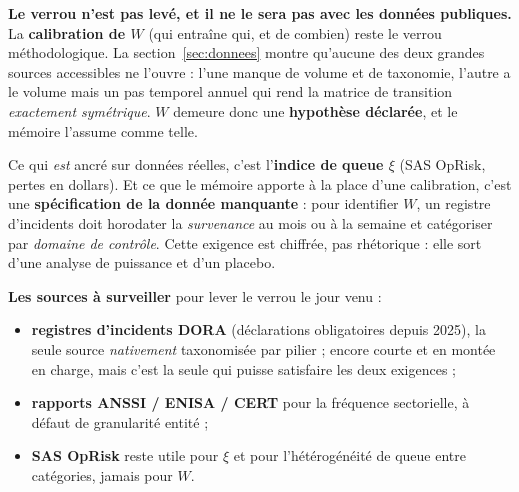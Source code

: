 \documentclass[11pt,a4paper]{article}
\begin{document}
\begin{attention}
\textbf{Le verrou n'est pas levé, et il ne le sera pas avec les données publiques.} La
\textbf{calibration de $W$} (qui entraîne qui, et de combien) reste le verrou méthodologique.
La section~\ref{sec:donnees} montre qu'aucune des deux grandes sources accessibles ne
l'ouvre : l'une manque de volume et de taxonomie, l'autre a le volume mais un pas temporel
annuel qui rend la matrice de transition \emph{exactement symétrique}. $W$ demeure donc une
\textbf{hypothèse déclarée}, et le mémoire l'assume comme telle.

\smallskip
\noindent Ce qui \emph{est} ancré sur données réelles, c'est l'\textbf{indice de queue $\xi$}
(SAS OpRisk, pertes en dollars). Et ce que le mémoire apporte à la place d'une calibration,
c'est une \textbf{spécification de la donnée manquante} : pour identifier $W$, un registre
d'incidents doit horodater la \emph{survenance} au mois ou à la semaine et catégoriser par
\emph{domaine de contrôle}. Cette exigence est chiffrée, pas rhétorique : elle sort d'une
analyse de puissance et d'un placebo.
\end{attention}

\begin{cle}
\textbf{Les sources à surveiller} pour lever le verrou le jour venu :
\begin{itemize}[leftmargin=1.4em,itemsep=1pt,topsep=2pt]
\item \textbf{registres d'incidents DORA} (déclarations obligatoires depuis 2025), la seule
  source \emph{nativement} taxonomisée par pilier ; encore courte et en montée en charge,
  mais c'est la seule qui puisse satisfaire les deux exigences ;
\item \textbf{rapports ANSSI / ENISA / CERT} pour la fréquence sectorielle, à défaut de
  granularité entité ;
\item \textbf{SAS OpRisk} reste utile pour $\xi$ et pour l'hétérogénéité de queue entre
  catégories, jamais pour $W$.
\end{itemize}
\end{cle}
\end{document}
